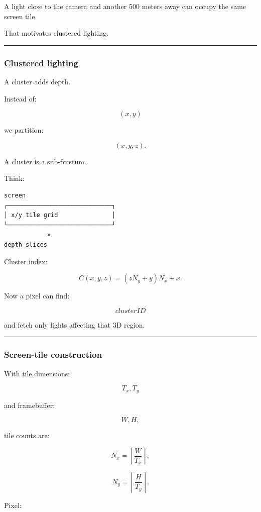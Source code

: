 A light close to the camera and another 500 meters away can occupy the same screen tile.

That motivates clustered lighting.

\begin{center}\rule{0.5\linewidth}{0.5pt}\end{center}

\subsubsection{Clustered lighting}\label{clustered-lighting}

A cluster adds depth.

Instead of:

\[
(x,y)
\]

we partition:

\[
(x,y,z).
\]

A cluster is a sub-frustum.

Think:

\begin{verbatim}
screen
┌─────────────────────────────┐
│ x/y tile grid               │
└─────────────────────────────┘
            ×
depth slices
\end{verbatim}

Cluster index:

\[
\boxed{
C(x,y,z)
=
(zN_y+y)N_x+x.
}
\]

Now a pixel can find:

\[
clusterID
\]

and fetch only lights affecting that 3D region.

\begin{center}\rule{0.5\linewidth}{0.5pt}\end{center}

\subsubsection{Screen-tile construction}\label{screen-tile-construction}

With tile dimensions:

\[
T_x,T_y
\]

and framebuffer:

\[
W,H,
\]

tile counts are:

\[
N_x=
\left\lceil\frac{W}{T_x}\right\rceil,
\]

\[
N_y=
\left\lceil\frac{H}{T_y}\right\rceil.
\]

Pixel:

